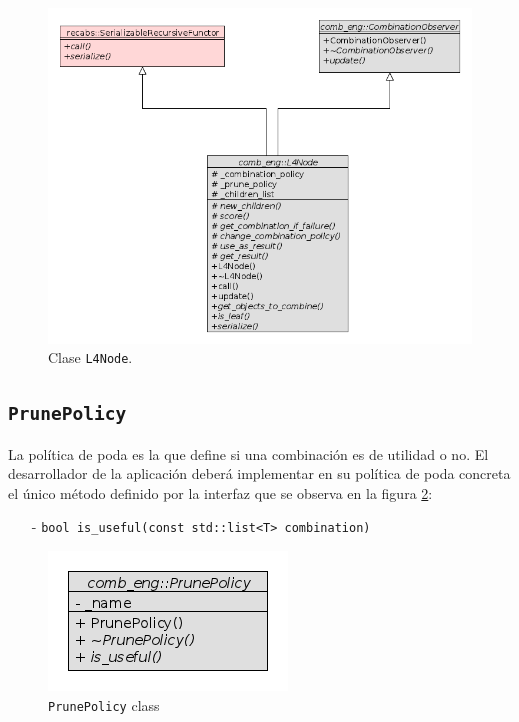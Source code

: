 			\begin{figure}[H] \hspace{.65cm}
    	 	    \includegraphics[scale=.46]{images/l4node_class.png}
		        \caption{Clase \texttt{L4Node}.}
		        \label{l4NodeClass}
            \end{figure}

		\subsection{\texttt{PrunePolicy}}
			La pol\'itica de poda es la que define si una combinaci\'on es de utilidad o no. El desarrollador de la aplicaci\'on deber\'a implementar en su 
			pol\'itica de poda concreta el \'unico m\'etodo definido por la interfaz que se observa en la figura \ref{prunePolicyClass}:
			\begin{itemize}
				\item[-] \footnotesize{\texttt{bool is\_useful(const std::list<T>  combination)}}
			\end{itemize}			
			\begin{figure}[H]\hspace{4cm}
   	   	\includegraphics[scale=.56]{images/prune_policy_class.png}
	      \caption{\texttt{PrunePolicy} class}
	      \label{prunePolicyClass}
       \end{figure}

